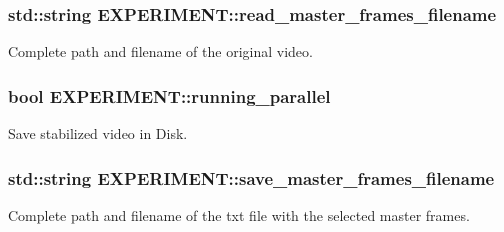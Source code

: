 \subsubsection[{\texorpdfstring{read\+\_\+master\+\_\+frames\+\_\+filename}{read\_master\_frames\_filename}}]{\setlength{\rightskip}{0pt plus 5cm}std\+::string E\+X\+P\+E\+R\+I\+M\+E\+N\+T\+::read\+\_\+master\+\_\+frames\+\_\+filename}\hypertarget{structEXPERIMENT_a3412818ed24d2c956b01e1d6561d7b50}{}\label{structEXPERIMENT_a3412818ed24d2c956b01e1d6561d7b50}


Complete path and filename of the original video. 

\subsubsection[{\texorpdfstring{running\+\_\+parallel}{running\_parallel}}]{\setlength{\rightskip}{0pt plus 5cm}bool E\+X\+P\+E\+R\+I\+M\+E\+N\+T\+::running\+\_\+parallel}\hypertarget{structEXPERIMENT_a74a95ad0fdb8e786e1555bcb4053af2e}{}\label{structEXPERIMENT_a74a95ad0fdb8e786e1555bcb4053af2e}


Save stabilized video in Disk. 

\subsubsection[{\texorpdfstring{save\+\_\+master\+\_\+frames\+\_\+filename}{save\_master\_frames\_filename}}]{\setlength{\rightskip}{0pt plus 5cm}std\+::string E\+X\+P\+E\+R\+I\+M\+E\+N\+T\+::save\+\_\+master\+\_\+frames\+\_\+filename}\hypertarget{structEXPERIMENT_af3623d64105d92bec8a761c5318ec534}{}\label{structEXPERIMENT_af3623d64105d92bec8a761c5318ec534}


Complete path and filename of the txt file with the selected master frames. 

